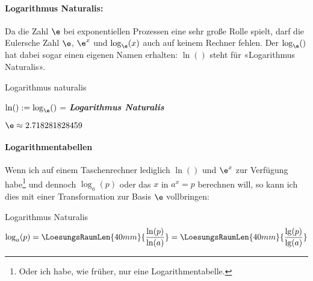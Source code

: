 \paragraph{Logarithmus Naturalis:} Da die
Zahl $\e$ bei exponentiellen Prozessen eine sehr große Rolle spielt,
darf die Eulersche Zahl $\e$, $\e^x$ und $\log_{\e}(x)$ auch auf keinem Rechner fehlen. Der $\log_{\e}()$ hat dabei sogar einen eigenen Namen erhalten:
$\ln()$ steht für «Logarithmus Naturalis».

\begin{definition}{Logarithmus naturalis}{}
  
  $\ln() := \log_{\e}()$ = \textit{\textbf{Logarithmus Naturalis}}

  $\e\approx 2.718281828459$
\end{definition}

\paragraph{Logarithmentabellen}
Wenn ich auf einem Taschenrechner lediglich $\ln()$ und $\e^x$ zur
Verfügung habe\footnote{Oder ich habe, wie früher, nur eine
Logarithmentabelle.} und dennoch $\log_a(p)$ oder das $x$ in $a^x=p$ berechnen will, so kann ich dies mit einer Transformation zur Basis $\e$ vollbringen:

\begin{gesetz}{Logarithmus Naturalis}{}
  $$\log_a(p) = \LoesungsRaumLen{40mm}{\frac{\ln(p)}{\ln(a)}}  = \LoesungsRaumLen{40mm}{\frac{\lg(p)}{\lg(a)}}$$
\end{gesetz}



\newpage


